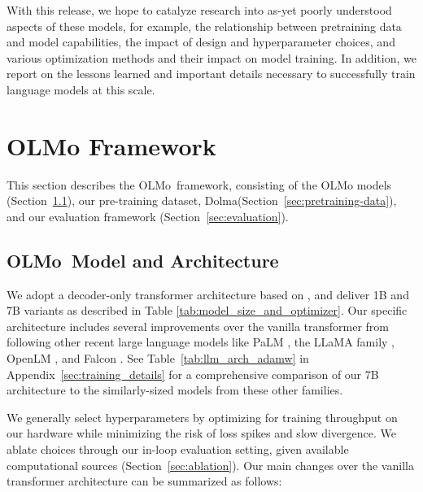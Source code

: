 \documentclass[11pt]{article}
\newcommand{\dolma}{Dolma\xspace}
\newcommand{\olmo}{OLMo\xspace}
\begin{document}
With this release, we hope to catalyze research into as-yet poorly understood aspects of these models, for example, the relationship between pretraining data and model capabilities, the impact of design and hyperparameter choices, and various optimization methods and their impact on model training. In addition, we report on the lessons learned and important details necessary to successfully train language models at this scale.

\section{\olmo Framework}
This section describes the \olmo~framework, consisting of the \olmo models (Section~\ref{sec:olmo-arch}), our pre-training dataset, \dolma (Section~\ref{sec:pretraining-data}), and our evaluation framework (Section~\ref{sec:evaluation}). 

\subsection{\olmo~Model and Architecture}\label{sec:olmo-arch}

We adopt a decoder-only transformer architecture based on \cite{vaswani2017attention},
and deliver 1B and 7B variants as described in Table \ref{tab:model_size_and_optimizer}.
Our specific architecture includes several improvements over the vanilla transformer from \cite{vaswani2017attention} following other recent large language models 
like PaLM \citep{chowdhery2022palm}, the LLaMA family \citep{touvron2023llama1, touvron2023llama2}, OpenLM \citep{open_lm}, and Falcon \citep{Falcon}.
See Table~\ref{tab:llm_arch_adamw} in Appendix~\ref{sec:training_details}  for a comprehensive comparison of our 7B architecture to the similarly-sized models from these other families.

We generally select hyperparameters by optimizing  for training throughput on our hardware while minimizing the risk of loss spikes and slow divergence. We ablate choices through our in-loop evaluation setting, given available computational sources (Section~\ref{sec:ablation}).  
Our main changes over the vanilla transformer architecture can be summarized as follows:
\end{document}
